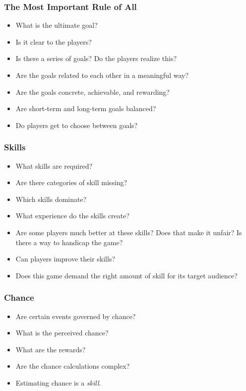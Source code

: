 \documentclass{beamer}
\begin{document}
\begin{frame}
  \frametitle{The Most Important Rule of All}

\begin{itemize}
  \item What is the ultimate goal?
\item Is it clear to the players?
\item Is there a series of goals?  Do the players realize this?
\item Are the goals related to each other in a meaningful way?
\item Are the goals concrete, achievable, and rewarding?
\item Are short-term and long-term goals balanced?
\item Do players get to choose between goals?

\end{itemize}

\end{frame}

\begin{frame}
  \frametitle{Skills}

\begin{itemize}
\item What skills are required?
\item Are there categories of skill missing?
\item Which skills dominate?
\item What experience do the skills create?
\item Are some players much better at these skills?  Does that make it
  unfair?  Is there a way to handicap the game?
\item Can players improve their skills?
\item Does this game demand the right amount of skill for its target
  audience? 

\end{itemize}

\end{frame}

\begin{frame}
  \frametitle{Chance}

\begin{itemize}
\item Are certain events governed by chance?
\item What is the perceived chance?
\item What are the rewards?
\item Are the chance calculations complex?
\item Estimating chance is a {\em skill}.
\end{itemize}

\end{frame}
\end{document}
